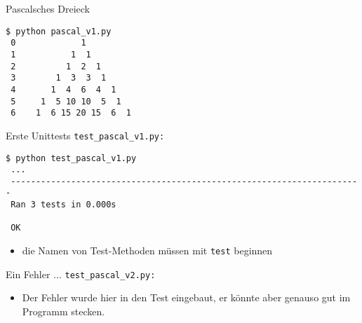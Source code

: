\documentclass[t, utf8x, 10pt]{beamer}
\begin{document}
\begin{frame}[fragile]{Pascalsches Dreieck}
 \begin{small}
  

  \begin{lstlisting}[language={}]
 $ python pascal_v1.py 
 0             1           
 1           1  1          
 2          1  2  1        
 3        1  3  3  1       
 4       1  4  6  4  1     
 5     1  5 10 10  5  1    
 6    1  6 15 20 15  6  1 
  \end{lstlisting}
 \end{small}
\end{frame}


\begin{frame}[fragile]{Erste Unittests}
 \texttt{test\_pascal\_v1.py:}
 \begin{scriptsize}
  

  \hrulefill

  \begin{lstlisting}[language={}]
 $ python test_pascal_v1.py 
 ...
 ----------------------------------------------------------------------
 Ran 3 tests in 0.000s
 
 OK
  \end{lstlisting}
 \end{scriptsize}
 \begin{itemize}
	 \item die Namen von Test-Methoden müssen mit \texttt{test} beginnen
 \end{itemize}
\end{frame}


\begin{frame}{Ein Fehler ...}
 \texttt{test\_pascal\_v2.py:}
 \begin{small}
  
 \end{small}
 \begin{itemize}
  \item Der Fehler wurde hier in den Test eingebaut, er könnte aber genauso
        gut im Programm stecken.
 \end{itemize}
\end{frame}
\end{document}
